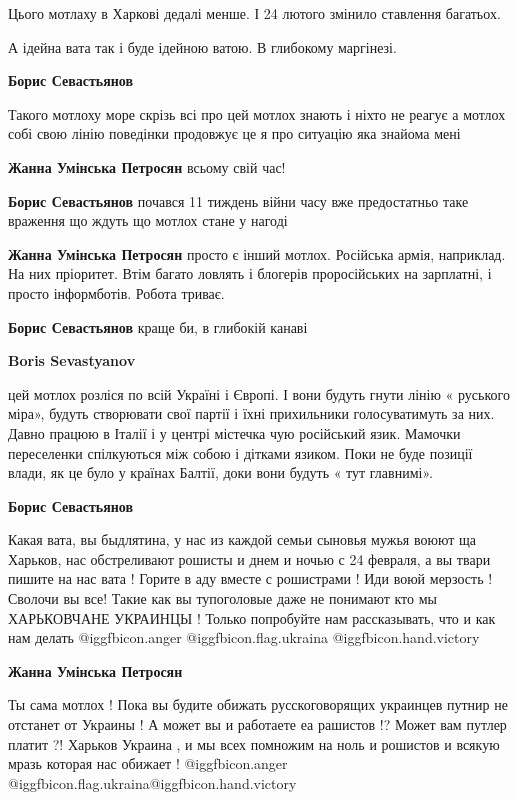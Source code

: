 \begin{itemize}

Цього мотлаху в Харкові дедалі менше. І 24 лютого змінило ставлення багатьох.

А ідейна вата так і буде ідейною ватою. В глибокому маргінезі.

\begin{itemize} %
\textbf{Борис Севастьянов} 

Такого мотлоху море скрізь всі про цей мотлох знають і ніхто не реагує а мотлох
собі свою лінію поведінки продовжує це я про ситуацію яка знайома мені

\textbf{Жанна Умінська Петросян} всьому свій час!

\textbf{Борис Севастьянов} почався 11 тиждень війни часу вже предостатньо таке враження що ждуть що мотлох стане у нагоді

\textbf{Жанна Умінська Петросян} просто є інший мотлох. Російська армія, наприклад. На них пріоритет. Втім багато ловлять і блогерів проросійських на зарплатні, і просто інформботів. Робота триває.

\textbf{Борис Севастьянов} краще би, в глибокій канаві

\textbf{Boris Sevastyanov} 

цей мотлох розліся по всій Україні і Європі. І вони будуть гнути лінію «
руського міра», будуть створювати свої партії і їхні прихильники
голосуватимуть за них. Давно працюю в Італії і у центрі містечка чую
російський язик. Мамочки переселенки спілкуються між собою і дітками язиком.
Поки не буде позиції влади, як це було у країнах Балтії, доки вони будуть «
тут главнимі».

\textbf{Борис Севастьянов} 

Какая вата, вы быдлятина, у нас из каждой семьи сыновья мужья воюют ща
Харьков, нас обстреливают рошисты и днем и ночью с 24 февраля, а вы твари
пишите на нас вата ! Горите в аду вместе с рошистрами ! Иди воюй мерзость !
Сволочи вы все! Такие как вы тупоголовые даже не понимают кто мы ХАРЬКОВЧАНЕ
УКРАИНЦЫ ! Только попробуйте нам рассказывать, что и как нам делать  @igg{fbicon.anger} @igg{fbicon.flag.ukraina} @igg{fbicon.hand.victory}

\textbf{Жанна Умінська Петросян} 

Ты сама мотлох ! Пока вы будите обижать русскоговорящих украинцев путнир не
отстанет от Украины ! А может вы и работаете еа рашистов !? Может вам путлер
платит ?! Харьков Украина , и мы всех помножим на ноль и рошистов и всякую
мразь которая нас обижает ! @igg{fbicon.anger} @igg{fbicon.flag.ukraina}@igg{fbicon.hand.victory}


\end{itemize}
\end{itemize}
